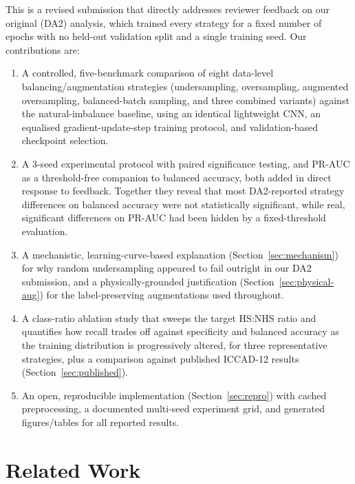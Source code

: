 \documentclass[conference]{IEEEtran}
\begin{document}
This is a revised submission that directly addresses reviewer feedback
on our original (DA2) analysis, which trained every strategy for a
fixed number of epochs with no held-out validation split and a single
training seed. Our contributions are:
\begin{enumerate}
    \item A controlled, five-benchmark comparison of eight data-level
    balancing/augmentation strategies (undersampling, oversampling,
    augmented oversampling, balanced-batch sampling, and three combined
    variants) against the natural-imbalance baseline, using an
    identical lightweight CNN, an equalised gradient-update-step
    training protocol, and validation-based checkpoint selection.
    \item A 3-seed experimental protocol with paired significance
    testing, and PR-AUC as a threshold-free companion to balanced
    accuracy, both added in direct response to feedback. Together
    they reveal that most DA2-reported strategy differences on
    balanced accuracy were not statistically significant, while
    real, significant differences on PR-AUC had been hidden by a
    fixed-threshold evaluation.
    \item A mechanistic, learning-curve-based explanation
    (Section~\ref{sec:mechanism}) for why random undersampling appeared
    to fail outright in our DA2 submission, and a physically-grounded
    justification (Section~\ref{sec:physical-aug}) for the
    label-preserving augmentations used throughout.
    \item A class-ratio ablation study that sweeps the target HS:NHS
    ratio and quantifies how recall trades off against specificity and
    balanced accuracy as the training distribution is progressively
    altered, for three representative strategies, plus a comparison
    against published ICCAD-12 results (Section~\ref{sec:published}).
    \item An open, reproducible implementation (Section~\ref{sec:repro})
    with cached preprocessing, a documented multi-seed experiment grid,
    and generated figures/tables for all reported results.
\end{enumerate}

\section{Related Work}
\end{document}
